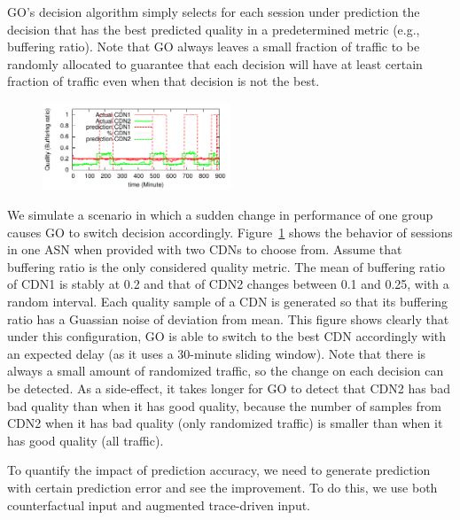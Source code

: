  GO's decision algorithm simply selects for each session under prediction the decision that has the best predicted quality in a predetermined metric (e.g., buffering ratio). Note that GO always leaves a small fraction of traffic to be randomly allocated to guarantee that each decision will have at least certain fraction of traffic even when that decision is not the best.


\begin{figure}[h!]
\centering
 \includegraphics[width=0.5\textwidth] {figures/behavior-evaluation/simple-change.pdf}
\label{fig:behavioral}
\end{figure}

 We simulate a scenario in which a sudden change in performance of one group causes GO to switch decision accordingly. Figure~\ref{fig:behavioral} shows the behavior of sessions in one ASN when provided with two CDNs to choose from. Assume that buffering ratio is the only considered quality metric. The mean of buffering ratio of CDN1 is stably at 0.2 and that of CDN2 changes between 0.1 and 0.25, with a random interval. Each quality sample of a CDN is generated so that its buffering ratio has a Guassian noise of \fillme deviation from mean. This figure shows clearly that under this configuration, GO is able to switch to the best CDN accordingly with an expected delay (as it uses a 30-minute sliding window). Note that there is always a small amount of randomized traffic, so the change on each decision can be detected. As a side-effect, it takes longer for GO to detect that CDN2 has bad bad quality than when it has good quality, because the number of samples from CDN2 when it has bad quality (only randomized traffic) is smaller than when it has good quality (all traffic).



To quantify the impact of prediction accuracy, we need to generate prediction with certain prediction error and see the improvement. To do this, we use both counterfactual input and augmented trace-driven input. 

